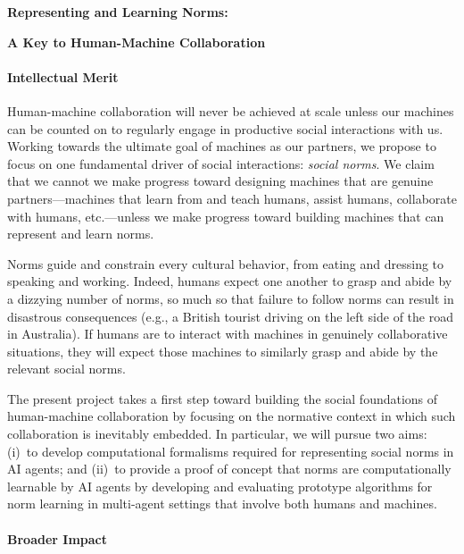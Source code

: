 
\centerline{\Large \bf Representing and Learning Norms:}
\centerline{\large \bf A Key to Human-Machine Collaboration}


\paragraph{Intellectual Merit}

Human-machine collaboration will never be achieved at scale unless our
machines can be counted on to regularly engage in productive social
interactions with us.  Working towards the ultimate goal of machines
as our partners, we propose to focus on one fundamental driver of
social interactions: \emph{social norms}.  We claim that we cannot
we make progress toward designing machines that are genuine
partners---machines that learn from and teach humans, assist humans,
collaborate with humans, etc.---unless we make progress toward
building machines that can represent and learn norms.

Norms guide and constrain every cultural behavior, from eating and
dressing to speaking and working.  Indeed, humans expect one another
to grasp and abide by a dizzying number of norms, so much so that
failure to follow norms can result in disastrous consequences (e.g., a
British tourist driving on the left side of the road in Australia).
If humans are to interact with machines in genuinely collaborative
situations, they will expect those machines to similarly grasp and
abide by the relevant social norms.

The present project takes a first step toward building the social
foundations of human-machine collaboration by focusing on the
normative context in which such collaboration is inevitably embedded.
In particular, we will pursue two aims:
%
(i)~to develop computational formalisms required for representing
social norms in AI agents; and (ii)~to provide a proof of concept that
norms are computationally learnable by AI agents by developing and
evaluating prototype algorithms for norm learning in multi-agent
settings that involve both humans and machines.


\paragraph{Broader Impact}




